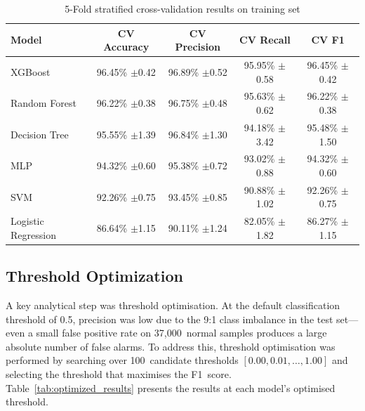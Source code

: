 \begin{table}[htbp]
    \centering
    \caption{5-Fold stratified cross-validation results on training set}
    \label{tab:cv_results}
    \begin{tabular}{lcccc}
        \toprule
        \textbf{Model} & \textbf{CV Accuracy} & \textbf{CV Precision} & \textbf{CV Recall} & \textbf{CV F1} \\
        \midrule
        XGBoost             & 96.45\% $\pm$0.42 & 96.89\% $\pm$0.52 & 95.95\% $\pm$0.58 & 96.45\% $\pm$0.42 \\
        Random Forest       & 96.22\% $\pm$0.38 & 96.75\% $\pm$0.48 & 95.63\% $\pm$0.62 & 96.22\% $\pm$0.38 \\
        Decision Tree       & 95.55\% $\pm$1.39 & 96.84\% $\pm$1.30 & 94.18\% $\pm$3.42 & 95.48\% $\pm$1.50 \\
        MLP                 & 94.32\% $\pm$0.60 & 95.38\% $\pm$0.72 & 93.02\% $\pm$0.88 & 94.32\% $\pm$0.60 \\
        SVM                 & 92.26\% $\pm$0.75 & 93.45\% $\pm$0.85 & 90.88\% $\pm$1.02 & 92.26\% $\pm$0.75 \\
        Logistic Regression & 86.64\% $\pm$1.15 & 90.11\% $\pm$1.24 & 82.05\% $\pm$1.82 & 86.27\% $\pm$1.15 \\
        \bottomrule
    \end{tabular}
\end{table}

\subsection{Threshold Optimization}

A key analytical step was threshold optimisation. At the default classification threshold of 0.5, precision was low due to the 9:1 class imbalance in the test set---even a small false positive rate on 37,000~normal samples produces a large absolute number of false alarms. To address this, threshold optimisation was performed by searching over 100~candidate thresholds $[0.00, 0.01, \ldots, 1.00]$ and selecting the threshold that maximises the F1~score. Table~\ref{tab:optimized_results} presents the results at each model's optimised threshold.

